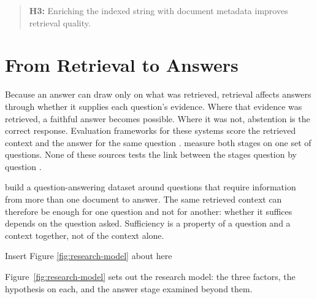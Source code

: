\begin{quote}
\textbf{H3:} Enriching the indexed string with document metadata improves
retrieval quality.
\end{quote}

\section{From Retrieval to Answers}

Because an answer can draw only on what was retrieved, retrieval affects answers
through whether it supplies each question's evidence.
Where that evidence was retrieved, a faithful answer becomes possible. Where it
was not, abstention is the correct response. Evaluation frameworks for these
systems score the retrieved context and the answer for the same question
\parencite{es2024,saad-falcon2024}. \textcite{kobeissi2026} measure both stages
on one set of questions. None of these sources tests the link between the stages
question by question \parencite{es2024,saad-falcon2024,kobeissi2026}.

\textcite{yang2018} build a question-answering dataset around questions that
require information from more than one document to answer. The same retrieved
context can therefore be enough for one question and not for another: whether it
suffices depends on the question asked. Sufficiency is a property of a question
and a context together, not of the context alone.

{\centering\noindent Insert Figure \ref{fig:research-model} about here\par}

Figure~\ref{fig:research-model} sets out the research model: the three factors,
the hypothesis on each, and the answer stage examined beyond them.
